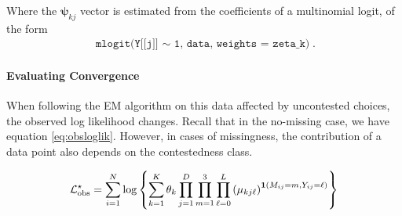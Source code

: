 \documentclass[11pt]{article}
\begin{document}
Where the \(\bm\psi_{kj}\) vector is estimated from the coefficients of a multinomial logit, of the form 
\begin{align*}
\texttt{mlogit(Y[[j]] \(\sim\) 1, data, weights = zeta\_k)}.
\end{align*}

\paragraph{Evaluating Convergence} When following the EM algorithm on this data affected by uncontested choices, the observed log likelihood changes. Recall that in the no-missing case,  we have equation \ref{eq:obsloglik}. However, in cases of missingness, the contribution of a data point also depends on the contestedness class.

\begin{align*}
{\mathcal{L}}^{\star}_{\text{obs}} = \sum^{N}_{i=1}\log \left\{\sum^{K}_{k=1}\theta_k \prod^{D}_{j=1}\prod^{3}_{m = 1}\prod^{L}_{\ell = 0}\left(\mu_{kj\ell}\right)^{\bm{1}\left(M_{ij} = m, Y_{ij} = \ell\right)}\right\}
\end{align*}
\end{document}
